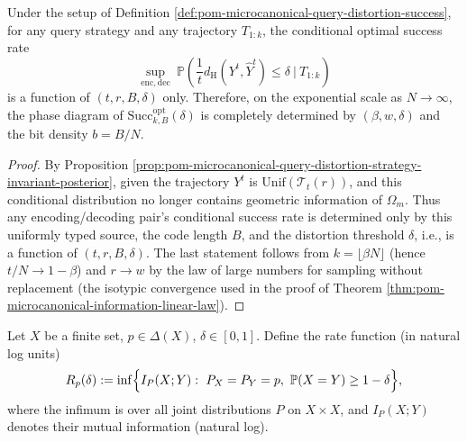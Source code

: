 \begin{proposition}\label{prop:pom-microcanonical-query-distortion-sufficient-statistic}
Under the setup of Definition \ref{def:pom-microcanonical-query-distortion-success},
for any query strategy and any trajectory \(T_{1:k}\), the conditional optimal success rate
\[
\sup_{\mathrm{enc},\mathrm{dec}}\ \mathbb{P}\!\left(\frac{1}{t}d_{\mathrm H}(Y^t,\widehat Y^t)\le \delta\ \Big|\ T_{1:k}\right)
\]
is a function of \((t,r,B,\delta)\) only.
Therefore, on the exponential scale as \(N\to\infty\), the phase diagram of \(\mathrm{Succ}^{\mathrm{opt}}_{k,B}(\delta)\) is completely determined by \((\beta,w,\delta)\) and the bit density \(b=B/N\).
\end{proposition}
\begin{proof}
By Proposition \ref{prop:pom-microcanonical-query-distortion-strategy-invariant-posterior}, given the trajectory \(Y^t\) is \(\mathrm{Unif}(\mathcal{T}_t(r))\), and this conditional distribution no longer contains geometric information of \(\Omega_m\).
Thus any encoding/decoding pair's conditional success rate is determined only by this uniformly typed source, the code length \(B\), and the distortion threshold \(\delta\), i.e., is a function of \((t,r,B,\delta)\).
The last statement follows from \(k=\lfloor\beta N\rfloor\) (hence \(t/N\to 1-\beta\)) and \(r\to w\) by the law of large numbers for sampling without replacement (the isotypic convergence used in the proof of Theorem \ref{thm:pom-microcanonical-information-linear-law}).
\end{proof}

\begin{definition}\label{def:pom-typed-diagonal-rate-function}
Let \(X\) be a finite set, \(p\in\Delta(X)\), \(\delta\in[0,1]\).
Define the rate function (in natural log units)
\[
R_p(\delta)
:=\inf\Bigl\{I_P(X;Y):\ P_X=P_Y=p,\ \mathbb{P}(X=Y)\ge 1-\delta\Bigr\},
\]
where the infimum is over all joint distributions \(P\) on \(X\times X\), and \(I_P(X;Y)\) denotes their mutual information (natural log).
\end{definition}

